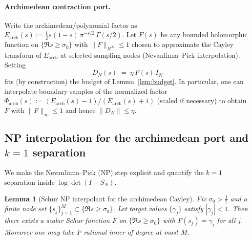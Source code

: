 \documentclass[11pt]{article}
\newtheorem{lemma}[theorem]{Lemma}
\theoremstyle{remark}
\begin{document}
\paragraph{Archimedean contraction port.}
Write the archimedean/polynomial factor as $E_{\mathrm{arch}}(s):=\tfrac12 s(1-s)\,\pi^{-s/2}\,\Gamma(s/2)$. Let $F(s)$ be any bounded holomorphic function on $\{\Re s\ge \sigma_0\}$ with $\|F\|_{H^\infty}\le 1$ chosen to approximate the Cayley transform of $E_{\mathrm{arch}}$ at selected sampling nodes (Nevanlinna--Pick interpolation). Setting
\[
 D_N(s)\;=\;\eta\,F(s)\,I_N
\]
fits (by construction) the budget of Lemma~\ref{lem:budget}. In particular, one can interpolate boundary samples of the normalized factor $\Phi_{\mathrm{arch}}(s):=(E_{\mathrm{arch}}(s)-1)/(E_{\mathrm{arch}}(s)+1)$ (scaled if necessary) to obtain $F$ with $\|F\|_\infty\le 1$ and hence $\|D_N\|\le \eta$.

\subsection{NP interpolation for the archimedean port and $k=1$ separation}\label{subsec:NP-arch}
We make the Nevanlinna--Pick (NP) step explicit and quantify the $k=1$ separation inside $\log\det(I-S_N)$.

\begin{lemma}[Schur NP interpolant for the archimedean Cayley]
Fix $\sigma_0>\tfrac12$ and a finite node set $\{s_j\}_{j=1}^{M}\subset\{\Re s\ge \sigma_0\}$. Let target values $\{\gamma_j\}$ satisfy $|\gamma_j|<1$. Then there exists a scalar Schur function $F$ on $\{\Re s\ge \sigma_0\}$ with $F(s_j)=\gamma_j$ for all $j$. Moreover one may take $F$ rational inner of degree at most $M$.
\end{lemma}
\end{document}
